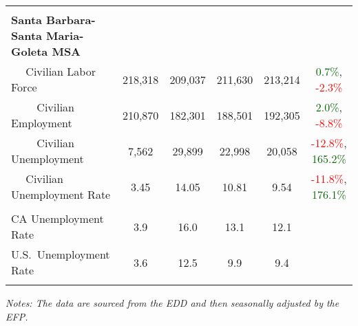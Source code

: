 \documentclass[12pt]{article}
\begin{document}
\begin{landscape}
\begin{table}
\begin{tabular}{|l|c|c|c|c|c|}
&&&&& \\
\textbf{Santa Barbara-Santa Maria-Goleta MSA} &&&&& \\
$\quad$ Civilian Labor Force &218,318 & 209,037 & 211,630 & 213,214 & \textcolor{darkgreen}{0.7\%}, \textcolor{red}{-2.3\%} \\
$\qquad$ \small Civilian Employment &210,870 & 182,301 & 188,501 & 192,305 & \textcolor{darkgreen}{2.0\%}, \textcolor{red}{-8.8\%} \\
$\qquad$ \small Civilian Unemployment &7,562 & 29,899 & 22,998 & 20,058 & \textcolor{red}{-12.8\%}, \textcolor{darkgreen}{165.2\%} \\
$\quad$ Civilian Unemployment Rate &3.45 & 14.05 & 10.81 & 9.54 & \textcolor{red}{-11.8\%}, \textcolor{darkgreen}{176.1\%} \\
&&&&& \\
CA Unemployment Rate & 3.9 & 16.0 & 13.1 & 12.1 & \\
U.S.\ Unemployment Rate & 3.6 & 12.5 & 9.9 & 9.4 & \\
& & & & & \\ \hline \hline
\end{tabular}
\par
\vspace{.5em}
\footnotesize
\textit{Notes: The data are sourced from the EDD and then seasonally adjusted by the EFP.}
\end{table}
\end{landscape}
\end{document}
